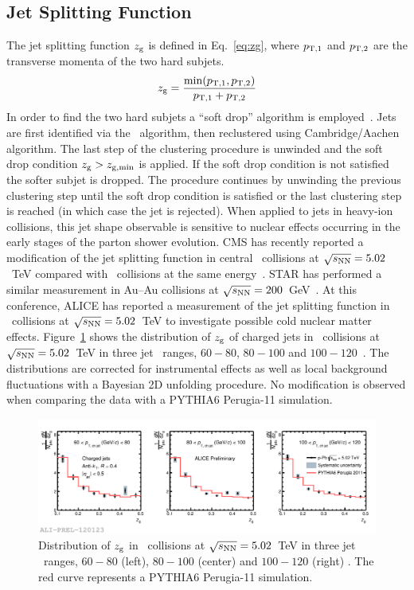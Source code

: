 \documentclass[10pt]{article}
\begin{document}
\subsection{Jet Splitting Function}
The jet splitting function $z_{\rm g}$ is defined in Eq.~\ref{eq:zg}, where $p_{\rm T,1}$ and $p_{\rm T,2}$ are the transverse momenta
of the two hard subjets.
\begin{equation}
z_{\rm g} = \frac{\min({p_{\rm T,1},p_{\rm T,2}})}{p_{\rm T,1}+p_{\rm T,2}}
\label{eq:zg}
\end{equation}
In order to find the two hard subjets a ``soft drop'' algorithm is employed~\cite{Larkoski:2014, Larkoski:2015}. Jets are first identified via the \antikt\ algorithm, then reclustered using Cambridge/Aachen algorithm.
The last step of the clustering procedure is unwinded and the soft drop condition $z_{\rm g} > z_{\rm g, min}$ is applied. If the soft drop condition is not satisfied the softer subjet is dropped.
The procedure continues by unwinding the previous clustering step until the soft drop condition is satisfied or the last clustering step is reached (in which case the jet is rejected).
When applied to jets in heavy-ion collisions, this jet shape observable is sensitive to nuclear effects occurring in the early stages of the parton shower evolution.
CMS has recently reported a modification of the jet splitting function in central \PbPb\ collisions at $\sqrt{s_{\rm NN}}=5.02$~TeV compared with
\pp\ collisions at the same energy~\cite{CMS:2017a}.
STAR has performed a similar measurement in Au--Au collisions at $\sqrt{s_{\rm NN}}=200$~GeV~\cite{Kauder:2017}.
At this conference, ALICE has reported a measurement of the jet splitting function in \pPb\ collisions at $\sqrt{s_{\rm NN}}=5.02$~TeV to investigate possible cold nuclear matter effects.
Figure~\ref{fig:zgppb} shows the distribution of $z_{\rm g}$ of charged jets in \pPb\ collisions at $\sqrt{s_{\rm NN}}=5.02$~TeV in three jet \pt\ ranges, $60-80$, $80-100$ and $100-120$~\GeVc. 
The distributions are corrected for instrumental effects as well as local background fluctuations with a Bayesian 2D unfolding procedure.
No modification is observed when comparing the data with a PYTHIA6 Perugia-11 simulation.
\begin{figure}[tb]
\centering
\includegraphics[width=.85\textwidth]{img/2017-Feb-01-zg_unfolded_20GeV_ALL}
\caption{Distribution of $z_{\rm g}$ in \pPb\ collisions at $\sqrt{s_{\rm NN}}=5.02$~TeV in three jet \pt\ ranges, $60-80$ (left), $80-100$ (center) and $100-120$ (right) \GeVc.
The red curve represents a PYTHIA6 Perugia-11 simulation.}
\label{fig:zgppb}
\end{figure}
\end{document}
